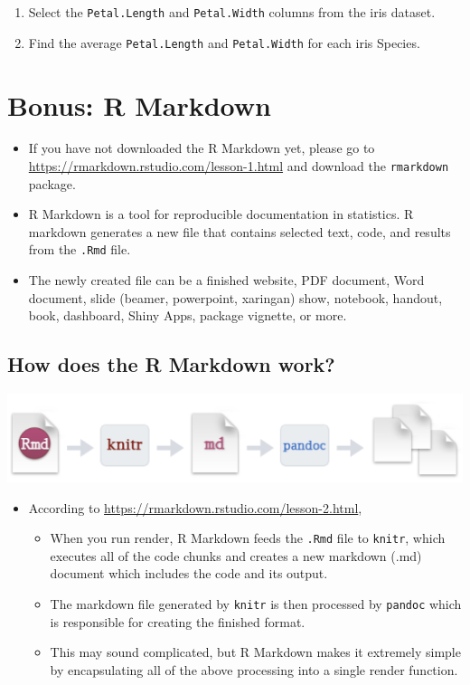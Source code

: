 \documentclass[
]{book}
\providecommand{\tightlist}{%
  \setlength{\itemsep}{0pt}\setlength{\parskip}{0pt}}
\begin{document}
\begin{enumerate}
\def\labelenumi{\arabic{enumi}.}
\setcounter{enumi}{1}
\tightlist
\item
  Select the \texttt{Petal.Length} and \texttt{Petal.Width} columns from the iris dataset.
\item
  Find the average \texttt{Petal.Length} and \texttt{Petal.Width} for each iris Species.
\end{enumerate}

\section{Bonus: R Markdown}\label{bonus-r-markdown}

\begin{itemize}
\tightlist
\item
  If you have not downloaded the R Markdown yet, please go to \url{https://rmarkdown.rstudio.com/lesson-1.html} and download the \texttt{rmarkdown} package.
\item
  R Markdown is a tool for reproducible documentation in statistics. R markdown generates a new file that contains selected text, code, and results from the \texttt{.Rmd} file.
\item
  The newly created file can be a finished website, PDF document, Word document, slide (beamer, powerpoint, xaringan) show, notebook, handout, book, dashboard, Shiny Apps, package vignette, or more.
\end{itemize}

\subsection{How does the R Markdown work?}\label{how-does-the-r-markdown-work}

\includegraphics{./img/rmarkdown_works.png}

\begin{itemize}
\tightlist
\item
  According to \url{https://rmarkdown.rstudio.com/lesson-2.html},

  \begin{itemize}
  \tightlist
  \item
    When you run render, R Markdown feeds the \texttt{.Rmd} file to \texttt{knitr}, which executes all of the code chunks and creates a new markdown (.md) document which includes the code and its output.
  \item
    The markdown file generated by \texttt{knitr} is then processed by \texttt{pandoc} which is responsible for creating the finished format.
  \item
    This may sound complicated, but R Markdown makes it extremely simple by encapsulating all of the above processing into a single render function.
  \end{itemize}
\end{itemize}
\end{document}
